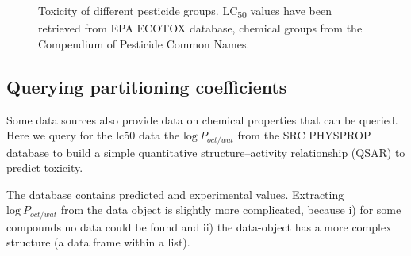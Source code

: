 \begin{figure}[ht]
\begin{knitrout}
\color{fgcolor}
\end{knitrout}
\caption[Toxicity of different pesticide groups.]{Toxicity of different pesticide groups. LC\textsubscript{50} values have been retrieved from EPA ECOTOX database, chemical groups from the Compendium of Pesticide Common Names.}
\label{fig:fig2}
\end{figure}


\subsection[Querying partitioning coefficients]{Querying partitioning coefficients}
Some data sources also provide data on chemical properties that can be queried.
Here we query for the lc50 data the $\mathrm{log}~P_{oct/wat}$ from the SRC PHYSPROP database to build a simple quantitative structure–activity relationship (QSAR) to predict toxicity.

\begin{knitrout}
\color{fgcolor}\begin{kframe}
\begin{alltt}
 \hlkwb{<-} \hlopt{$}
\end{alltt}
\end{kframe}
\end{knitrout}

The database contains predicted and experimental values.
Extracting \\ $\mathrm{log}~P_{oct/wat}$ from the data object is slightly more complicated,  
because i) for some compounds no data could be found and ii) the data-object has a more complex structure (a data frame within a list).



